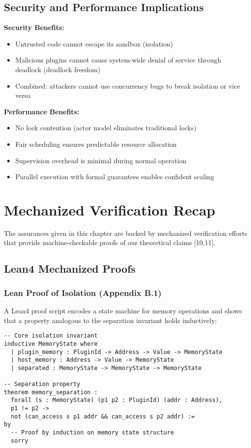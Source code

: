 \subsection{Security and Performance Implications}

\textbf{Security Benefits:}
\begin{itemize}
\item Untrusted code cannot escape its sandbox (isolation)
\item Malicious plugins cannot cause system-wide denial of service through deadlock (deadlock freedom)
\item Combined: attackers cannot use concurrency bugs to break isolation or vice versa
\end{itemize}

\textbf{Performance Benefits:}
\begin{itemize}
\item No lock contention (actor model eliminates traditional locks)
\item Fair scheduling ensures predictable resource allocation
\item Supervision overhead is minimal during normal operation
\item Parallel execution with formal guarantees enables confident scaling
\end{itemize}

\newpage

\section{Mechanized Verification Recap}

The assurances given in this chapter are backed by mechanized verification efforts that provide machine-checkable proofs of our theoretical claims [10,11].

\subsection{Lean4 Mechanized Proofs}

\subsubsection{Lean Proof of Isolation (Appendix B.1)}

A Lean4 proof script encodes a state machine for memory operations and shows that a property analogous to the separation invariant holds inductively:

\begin{lstlisting}[style=lean,caption={Lean4 isolation proof structure}]
-- Core isolation invariant
inductive MemoryState where
  | plugin_memory : PluginId -> Address -> Value -> MemoryState
  | host_memory : Address -> Value -> MemoryState
  | separated : MemoryState -> MemoryState -> MemoryState

-- Separation property
theorem memory_separation :
  forall (s : MemoryState) (p1 p2 : PluginId) (addr : Address),
  p1 != p2 ->
  not (can_access s p1 addr && can_access s p2 addr) :=
by
  -- Proof by induction on memory state structure
  sorry
\end{lstlisting}

